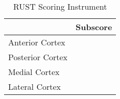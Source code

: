 \begin{table}[H]
    \centering
    \begin{tabular}{@{}ll@{}}
    \toprule
                                   & Subscore \\ \midrule
    Anterior Cortex                &          \\
    Posterior Cortex               &          \\
    Medial Cortex                  &          \\
    Lateral Cortex                 &          \\ \bottomrule
    \end{tabular}
    \caption{RUST Scoring Instrument}\label{tab:rust-cortices}
\end{table}
